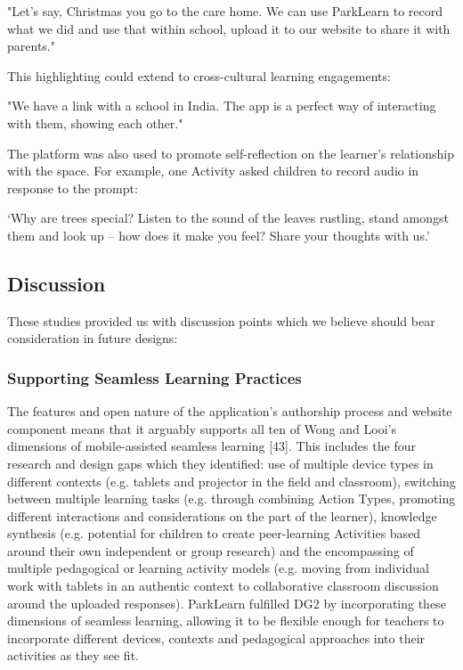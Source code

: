 \begin{displayquote}
"Let’s say, Christmas you go to the care home. We can use ParkLearn to record what we did and use that within school, upload it to our website to share it with parents."
\end{displayquote}

This highlighting could extend to cross-cultural learning engagements: 

\begin{displayquote}
"We have a link with a school in India. The app is a perfect way of interacting with them, showing each other."
\end{displayquote}

The platform was also used to promote self-reflection on the learner’s relationship with the space. For example, one Activity asked children to record audio in response to the prompt:

\begin{displayquote}
`Why are trees special? Listen to the sound of the leaves rustling, stand amongst them and look up – how does it make you feel? Share your thoughts with us.' 
\end{displayquote}

\subsection{Discussion}
\label{sec:TeacherDiscussion}
These studies provided us with discussion points which we believe should bear consideration in future designs:

\subsubsection{Supporting Seamless Learning Practices}

The features and open nature of the application’s authorship process and website component means that it arguably supports all ten of Wong and Looi’s dimensions of mobile-assisted seamless learning [43].  This includes the four research and design gaps which they identified: use of multiple device types in different contexts (e.g. tablets and projector in the field and classroom), switching between multiple learning tasks (e.g. through combining Action Types, promoting different interactions and considerations on the part of the learner), knowledge synthesis (e.g. potential for children to create peer-learning Activities based around their own independent or group research) and the encompassing of multiple pedagogical or learning activity models (e.g. moving from individual work with tablets in an authentic context to collaborative classroom discussion around the uploaded responses). ParkLearn fulfilled DG2 by incorporating these dimensions of seamless learning, allowing it to be flexible enough for teachers to incorporate different devices, contexts and pedagogical approaches into their activities as they see fit.
  
